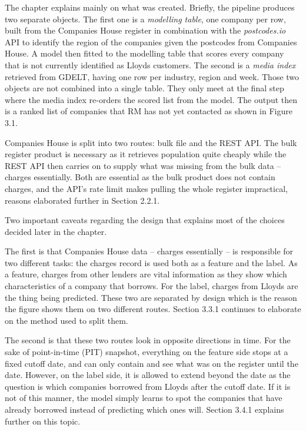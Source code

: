 \documentclass[ %
                    author={Natchalin Iwsakul \\[0.4em] Inkaphol Siriwongwattana \\[0.4em] Tanaphan Kummaraphat \\[0.6em] Patorn Srisupap},,
                supervisor={Fernando Moreno-Pino},
                    degree={MSc},
                     title={Propensity Modelling for SME Commercial Lending Using Open Public Data
},
                  subtitle={Companies House and GDELT as predictors of first-time borrowing},
                      type={},
                      year={2026}]{dissertation}
\begin{document}
The chapter explains mainly on what was created. Briefly, the pipeline produces two separate objects. The first one is a \textit{modelling table}, one company per row, built from the Companies House register in combination with the \textit{postcodes.io} API to identify the region of the companies given the postcodes from Companies House. A model then fitted to the modelling table that scores every company that is not currently identified as Lloyds customers. The second is a \textit{media index} retrieved from GDELT, having one row per industry, region and week. Those two objects are not combined into a single table. They only meet at the final step where the media index re-orders the scored list from the model. The output then is a ranked list of companies that RM has not yet contacted as shown in Figure 3.1.

Companies House is split into two routes: bulk file and the REST API. The bulk register product is necessary as it retrieves population quite cheaply while the REST API then carries on to supply what was missing from the bulk data -- charges essentially. Both are essential as the bulk product does not contain charges, and the API's rate limit makes pulling the whole register impractical, reasons elaborated further in Section 2.2.1.

Two important caveats regarding the design that explains most of the choices decided later in the chapter.

The first is that Companies House data -- charges essentially -- is responsible for two different tasks: the charges record is used both as a feature and the label. As a feature, charges from other lenders are vital information as they show which characteristics of a company that borrows. For the label, charges from Lloyds are the thing being predicted. These two are separated by design which is the reason the figure shows them on two different routes. Section 3.3.1 continues to elaborate on the method used to split them.

The second is that these two routes look in opposite directions in time. For the sake of point-in-time (PIT) snapshot, everything on the feature side stops at a fixed cutoff date, and can only contain and see what was on the register until the date. However, on the label side, it is allowed to extend beyond the date as the question is which companies borrowed from Lloyds after the cutoff date. If it is not of this manner, the model simply learns to spot the companies that have already borrowed instead of predicting which ones will. Section 3.4.1 explains further on this topic.
\end{document}
